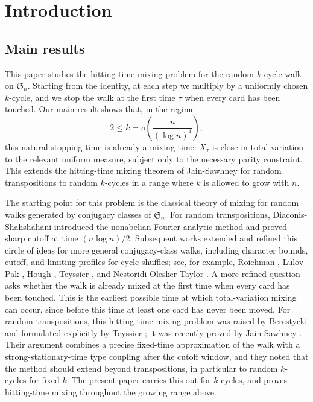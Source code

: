 \section{Introduction}\label{sec: Intro}

\subsection{Main results}

This paper studies the hitting-time mixing problem for the random \(k\)-cycle walk on \(\mathfrak S_n\). Starting from the identity, at each step we multiply by a uniformly chosen \(k\)-cycle, and we stop the walk at the first time \(\tau\) when every card has been touched. Our main result shows that, in the regime
$$
2\leq k=o\left(\frac{n}{(\log n)^4}\right),
$$
this natural stopping time is already a mixing time: \(X_\tau\) is close in total variation to the relevant uniform measure, subject only to the necessary parity constraint. This extends the hitting-time mixing theorem of Jain-Sawhney \cite{jain2024hitting} for random transpositions to random \(k\)-cycles in a range where \(k\) is allowed to grow with \(n\).

The starting point for this problem is the classical theory of mixing for random walks generated by conjugacy classes of \(\mathfrak S_n\). For random transpositions, Diaconis-Shahshahani \cite{diaconis1981generating} introduced the nonabelian Fourier-analytic method and proved sharp cutoff at time \((n\log n)/2\). Subsequent works extended and refined this circle of ideas for more general conjugacy-class walks, including character bounds, cutoff, and limiting profiles for cycle shuffles; see, for example, Roichman \cite{Roichman1996}, Lulov-Pak \cite{lulov2002rapidly}, Hough \cite{hough2016random}, Teyssier \cite{teyssier2020limit}, and Nestoridi-Olesker-Taylor \cite{nestoridi2022limit}. A more refined question asks whether the walk is already mixed at the first time when every card has been touched. This is the earliest possible time at which total-variation mixing can occur, since before this time at least one card has never been moved. For random transpositions, this hitting-time mixing problem was raised by Berestycki and formulated explicitly by Teyssier \cite[Conjecture 1.2]{teyssier2020limit}; it was recently proved by Jain-Sawhney \cite{jain2024hitting}. Their argument combines a precise fixed-time approximation of the walk with a strong-stationary-time type coupling after the cutoff window, and they noted that the method should extend beyond transpositions, in particular to random \(k\)-cycles for fixed \(k\). The present paper carries this out for \(k\)-cycles, and proves hitting-time mixing throughout the growing range above.

